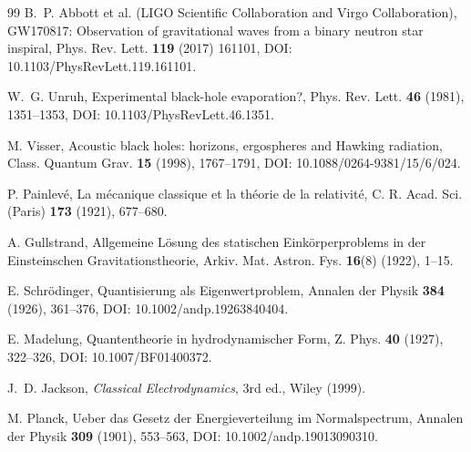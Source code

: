 \documentclass[11pt]{article}
\theoremstyle{definition}
\theoremstyle{plain}
\theoremstyle{remark}
\begin{document}
\begin{thebibliography}{99}
            B.~P. Abbott et al. (LIGO Scientific Collaboration and Virgo Collaboration),
            \newblock GW170817: Observation of gravitational waves from a binary neutron star inspiral,
            \newblock Phys. Rev. Lett. \textbf{119} (2017) 161101,
            \newblock DOI: 10.1103/PhysRevLett.119.161101.

            W.~G. Unruh,
            \newblock Experimental black-hole evaporation?,
            \newblock Phys. Rev. Lett. \textbf{46} (1981), 1351--1353,
            \newblock DOI: 10.1103/PhysRevLett.46.1351.

            M. Visser,
            \newblock Acoustic black holes: horizons, ergospheres and Hawking radiation,
            \newblock Class. Quantum Grav. \textbf{15} (1998), 1767--1791,
            \newblock DOI: 10.1088/0264-9381/15/6/024.

            P. Painlev\'e,
            \newblock La m\'ecanique classique et la th\'eorie de la relativit\'e,
            \newblock C. R. Acad. Sci. (Paris) \textbf{173} (1921), 677--680.

            A. Gullstrand,
            \newblock Allgemeine L\"osung des statischen Eink\"orperproblems in der Einsteinschen Gravitationstheorie,
            \newblock Arkiv. Mat. Astron. Fys. \textbf{16}(8) (1922), 1--15.

            E. Schr\"odinger,
            \newblock Quantisierung als Eigenwertproblem,
            \newblock Annalen der Physik \textbf{384} (1926), 361--376,
            \newblock DOI: 10.1002/andp.19263840404.

            E. Madelung,
            \newblock Quantentheorie in hydrodynamischer Form,
            \newblock Z. Phys. \textbf{40} (1927), 322--326,
            \newblock DOI: 10.1007/BF01400372.

            J.~D. Jackson,
            \newblock \emph{Classical Electrodynamics}, 3rd ed.,
            \newblock Wiley (1999).

            M. Planck,
            \newblock Ueber das Gesetz der Energieverteilung im Normalspectrum,
            \newblock Annalen der Physik \textbf{309} (1901), 553--563,
            \newblock DOI: 10.1002/andp.19013090310.



\end{thebibliography}
\end{document}
